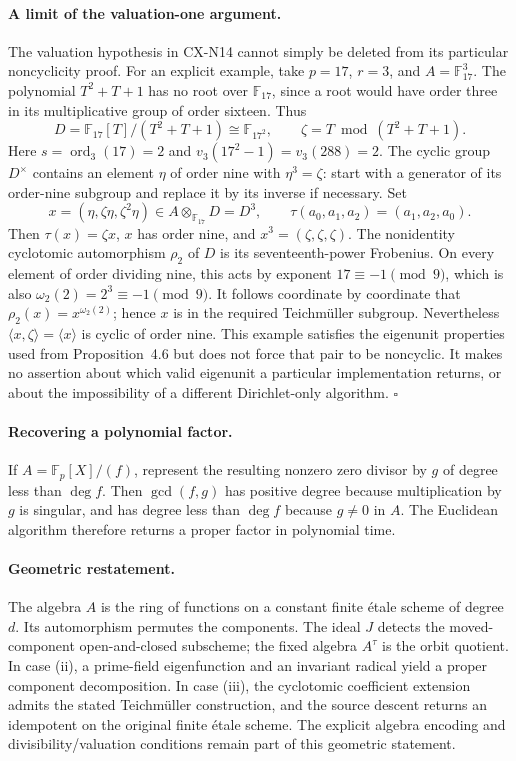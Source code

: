 \documentclass[11pt,a4paper]{article}
\begin{document}
\paragraph{A limit of the valuation-one argument.}
The valuation hypothesis in CX-N14 cannot simply be deleted from
its particular noncyclicity proof.
For an explicit example, take \(p=17\), \(r=3\), and
\(A=\mathbb F_{17}^3\).
The polynomial \(T^2+T+1\) has no root over \(\mathbb F_{17}\),
since a root would have order three in its multiplicative group
of order sixteen. Thus
\[
 D=\mathbb F_{17}[T]/(T^2+T+1)\cong\mathbb F_{17^2},
 \qquad \zeta=T\bmod(T^2+T+1).
\]
Here \(s=\operatorname{ord}_3(17)=2\) and
\(v_3(17^2-1)=v_3(288)=2\).
The cyclic group \(D^\times\) contains an element \(\eta\) of
order nine with \(\eta^3=\zeta\): start with a generator of its
order-nine subgroup and replace it by its inverse if necessary.
Set
\[
 x=(\eta,\zeta\eta,\zeta^2\eta)\in
 A\otimes_{\mathbb F_{17}}D=D^3,
 \qquad
 \tau(a_0,a_1,a_2)=(a_1,a_2,a_0).
\]
Then \(\tau(x)=\zeta x\), \(x\) has order nine, and
\(x^3=(\zeta,\zeta,\zeta)\).
The nonidentity cyclotomic automorphism \(\rho_2\) of \(D\)
is its seventeenth-power Frobenius.
On every element of order dividing nine, this acts by exponent
\(17\equiv-1\pmod9\), which is also
\(\omega_2(2)=2^3\equiv-1\pmod9\).
It follows coordinate by coordinate that
\(\rho_2(x)=x^{\omega_2(2)}\); hence \(x\) is in the required
Teichm\"uller subgroup.
Nevertheless \(\langle x,\zeta\rangle=\langle x\rangle\)
is cyclic of order nine.
This example satisfies the eigenunit properties used from
Proposition~4.6 but does not force that pair to be noncyclic.
It makes no assertion about which valid eigenunit a particular
implementation returns, or about the impossibility of a different
Dirichlet-only algorithm.
\hfill\(\square\)

\paragraph{Recovering a polynomial factor.}
If \(A=\mathbb F_p[X]/(f)\), represent the resulting nonzero zero
divisor by \(g\) of degree less than \(\deg f\).
Then \(\gcd(f,g)\) has positive degree because multiplication by
\(g\) is singular, and has degree less than \(\deg f\) because
\(g\ne0\) in \(A\). The Euclidean algorithm therefore returns
a proper factor in polynomial time.

\paragraph{Geometric restatement.}
The algebra \(A\) is the ring of functions on a constant finite
\'etale scheme of degree \(d\).
Its automorphism permutes the components.
The ideal \(J\) detects the moved-component open-and-closed
subscheme; the fixed algebra \(A^\tau\) is the orbit quotient.
In case (ii), a prime-field eigenfunction and an invariant radical
yield a proper component decomposition.
In case (iii), the cyclotomic coefficient extension admits the
stated Teichm\"uller construction, and the source descent returns
an idempotent on the original finite \'etale scheme.
The explicit algebra encoding and divisibility/valuation conditions
remain part of this geometric statement.
\end{document}
